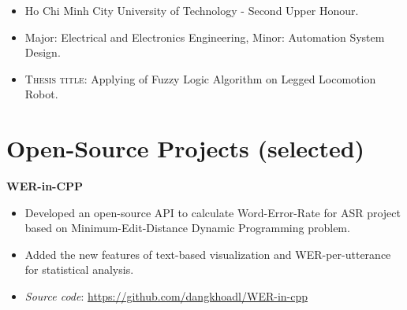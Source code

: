 \documentclass[10pt]{article}
\begin{document}
        \vspace{-5mm}
        \begin{itemize}[noitemsep]
            \item Ho Chi Minh City University of Technology - Second Upper Honour.
            \item Major: Electrical and Electronics Engineering, Minor: Automation System Design.
            \item \textsc{Thesis title}: Applying of Fuzzy Logic Algorithm on Legged Locomotion Robot.
        \end{itemize}
    \vspace{2mm}
    \section{Open-Source Projects (selected)}
        \vspace{-2mm}
        \begin{multicols}{1}
            \begin{flushleft}
                \textbf{WER-in-CPP}
            \end{flushleft}
        \end{multicols}
        \vspace{-5mm}
        \begin{itemize}[noitemsep]
            \item Developed an open-source API to calculate Word-Error-Rate for ASR project based on Minimum-Edit-Distance Dynamic Programming problem.
            \item Added the new features of text-based visualization and WER-per-utterance for statistical analysis.
            \item \emph{Source code}: \href{https://github.com/dangkhoadl/WER-in-cpp}{https://github.com/dangkhoadl/WER-in-cpp}
        \end{itemize}
        \vspace{-2mm}
\end{document}
